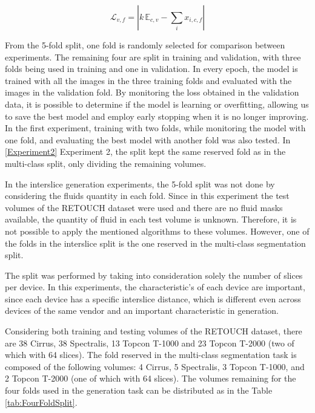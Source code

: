 \begin{equation}
	\mathcal{L}_{v, f} = 
	| k\, \mathbb{E}_{c,v} - \sum_{i} x_{i,c,f} |
	\label{eq:BinaryFoldLoss}
\end{equation}

From the 5-fold split, one fold is randomly selected for comparison between experiments. The remaining four are split in training and validation, with three folds being used in training and one in validation. In every epoch, the model is trained with all the images in the three training folds and evaluated with the images in the validation fold. By monitoring the loss obtained in the validation data, it is possible to determine if the model is learning or overfitting, allowing us to save the best model and employ early stopping when it is no longer improving. In the first experiment, training with two folds, while monitoring the model with one fold, and evaluating the best model with another fold was also tested. In \ref{Experiment2} Experiment 2, the split kept the same reserved fold as in the multi-class split, only dividing the remaining volumes.
\par
In the interslice generation experiments, the 5-fold split was not done by considering the fluids quantity in each fold. Since in this experiment the test volumes of the RETOUCH dataset were used and there are no fluid masks available, the quantity of fluid in each test volume is unknown. Therefore, it is not possible to apply the mentioned algorithms to these volumes. However, one of the folds in the interslice split is the one reserved in the multi-class segmentation split.
\par
The split was performed by taking into consideration solely the number of slices per device. In this experiments, the characteristic's of each device are important, since each device has a specific interslice distance, which is different even across devices of the same vendor and an important characteristic in generation.
\par
Considering both training and testing volumes of the RETOUCH dataset, there are 38 Cirrus, 38 Spectralis, 13 Topcon T-1000 and 23 Topcon T-2000 (two of which with 64 slices). The fold reserved in the multi-class segmentation task is composed of the following volumes: 4 Cirrus, 5 Spectralis, 3 Topcon T-1000, and 2 Topcon T-2000 (one of which with 64 slices). The volumes remaining for the four folds used in the generation task can be distributed as in the Table \ref{tab:FourFoldSplit}.

